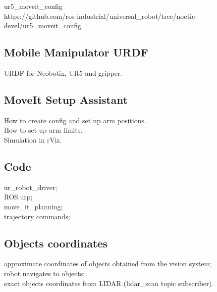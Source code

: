 ur5\_moveit\_config\\
https://github.com/ros-industrial/universal\_robot/tree/noetic-devel/ur5\_moveit\_config\\



\subsection{Mobile Manipulator URDF}
URDF for Neobotix, UR5 and gripper.\\

\subsection{MoveIt Setup Assistant}
How to create config and set up arm positions.\\
How to set up arm limits.\\
Simulation in rViz.\\

\subsection{Code}
ur\_robot\_driver;\\
ROS.urp;\\
move\_it\_planning;\\
trajectory commands;\\

\subsection{Objects coordinates}
approximate coordinates of objects obtained from the vision system; \\
robot navigates to objects; \\
exact objects coordinates from LIDAR (lidar\_scan topic subscriber).\\










